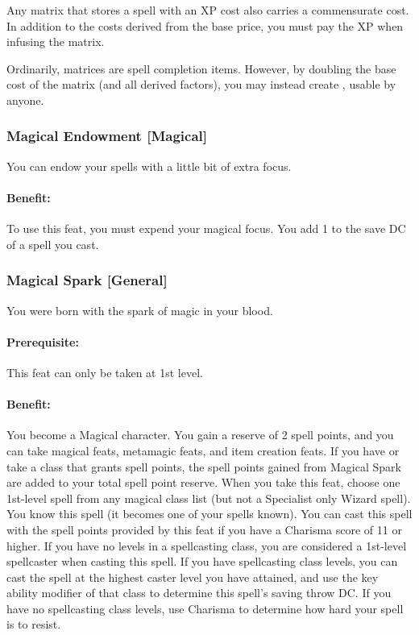 Any matrix that stores a spell with an XP cost also carries a commensurate cost. 
In addition to the costs derived from the base price, you must pay the XP when infusing the matrix.

Ordinarily, matrices are spell completion items. 
However, by doubling the base cost of the matrix (and all derived factors), you may instead create , usable by anyone.
\subsubsection[Magical Endowment]{Magical Endowment [Magical]}
\label{Feat:MagicalEndowment}
You can endow your spells with a little bit of extra focus.

\paragraph{Benefit:} To use this feat, you must expend your magical focus. You add 1 to the save DC of a spell you cast.

\subsubsection[Magical Spark]{Magical Spark [General]}
\label{Feat:MagicalSpark}
You were born with the spark of magic in your blood.

\paragraph{Prerequisite:} This feat can only be taken at 1st level.

\paragraph{Benefit:}
You become a Magical character. You gain a reserve of 2 spell points, and you can take
magical feats, metamagic feats, and item creation feats.
If you have or take a class that grants spell points, the spell
points gained from Magical Spark are added to your total spell
point reserve.
When you take this feat, choose one 1st-level spell from any
magical class list (but not a Specialist only Wizard spell).
You know this spell (it becomes one of your
spells known). You can cast this spell with the spell
points provided by this feat if you have a Charisma score of 11
or higher. If you have no levels in a spellcasting class, you are considered
a 1st-level spellcaster when casting this spell. If you have
spellcasting class levels, you can cast the spell at the highest
caster level you have attained, and use the key ability modifier of that class to determine this spell's saving throw DC.
If you have no spellcasting class levels, use Charisma to determine how hard your spell is to resist.

